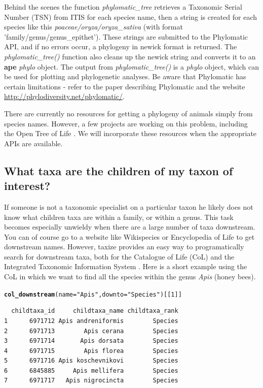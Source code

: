 \documentclass[10pt]{article}\usepackage[]{graphicx}\usepackage[]{color}
\makeatletter
\newcommand{\hlfunctioncall}[1]{\textcolor[rgb]{0.501960784313725,0,0.329411764705882}{\textbf{#1}}}%
\newcommand{\hlstring}[1]{\textcolor[rgb]{0.6,0.6,1}{#1}}%
\newenvironment{kframe}{%
 \def\at@end@of@kframe{}%
 \ifinner\ifhmode%
  \def\at@end@of@kframe{\end{minipage}}%
  \begin{minipage}{\columnwidth}%
 \fi\fi%
 \def\FrameCommand##1{\hskip\@totalleftmargin \hskip-\fboxsep
 \colorbox{shadecolor}{##1}\hskip-\fboxsep
     \hskip-\linewidth \hskip-\@totalleftmargin \hskip\columnwidth}%
 \MakeFramed {\advance\hsize-\width
   \@totalleftmargin\z@ \linewidth\hsize
   \@setminipage}}%
 {\par\unskip\endMakeFramed%
 \at@end@of@kframe}
\newenvironment{knitrout}{}{} %
\makeatother
\begin{document}
Behind the scenes the function \emph{phylomatic\_tree} retrieves a Taxonomic Serial Number (TSN) from ITIS for each species name, then a string is created for each species like this \emph{poaceae/oryza/oryza\_sativa} (with format 'family/genus/genus\_epithet'). These strings are submitted to the Phylomatic API, and if no errors occur, a phylogeny in newick format is returned. The \emph{phylomatic\_tree()} function also cleans up the newick string and converts it to an \textbf{ape} \emph{phylo} object. The output from \emph{phylomatic\_tree()} is a \emph{phylo} object, which can be used for plotting and phylogenetic analyses. Be aware that Phylomatic has certain limitations - refer to the paper describing Phylomatic \cite{webb2005} and the website \url{http://phylodiversity.net/phylomatic/}.

There are currently no resources for getting a phylogeny of animals simply from species names. However, a few projects are working on this problem, including the Open Tree of Life \cite{opentree}. We will incorporate these resources when the appropriate APIs are available.


\subsection*{What taxa are the children of my taxon of interest?}
If someone is not a taxonomic specialist on a particular taxon he likely does not know what children taxa are within a family, or within a genus. This task becomes especially unwieldy when there are a large number of taxa downstream. You can of course go to a website like Wikispecies \cite{wikispecies} or Encyclopedia of Life \cite{eol} to get downstream names. However, taxize provides an easy way to programatically search for downstream taxa, both for the Catalogue of Life (CoL) \cite{col} and the Integrated Taxonomic Information System \cite{itis}. Here is a short example using the CoL in which we want to find all the species within the genus \emph{Apis} (honey bees).

\begin{knitrout}
\color{fgcolor}\begin{kframe}
\begin{alltt}
\hlfunctioncall{col_downstream}(name = \hlstring{"Apis"}, downto = \hlstring{"Species"})[[1]]
\end{alltt}
\begin{verbatim}
  childtaxa_id     childtaxa_name childtaxa_rank
1      6971712 Apis andreniformis        Species
2      6971713        Apis cerana        Species
3      6971714       Apis dorsata        Species
4      6971715        Apis florea        Species
5      6971716 Apis koschevnikovi        Species
6      6845885     Apis mellifera        Species
7      6971717   Apis nigrocincta        Species
\end{verbatim}
\end{kframe}
\end{knitrout}
\end{document}
